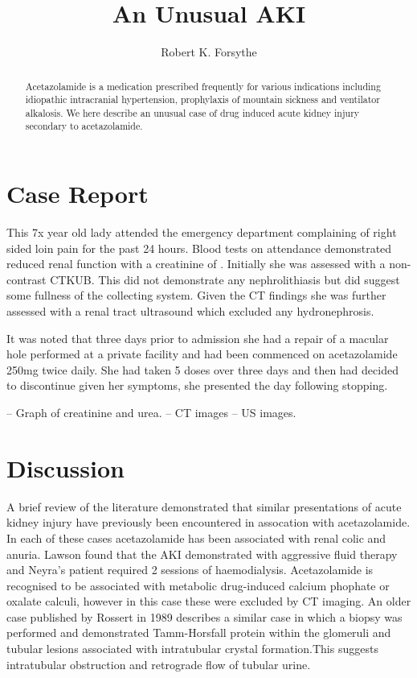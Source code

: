 \documentclass[11pt]{article}
\title{An Unusual AKI}
\author{Robert K. Forsythe}
\begin{document}
\maketitle
\begin{abstract}
	Acetazolamide is a medication prescribed frequently for various indications including idiopathic intracranial hypertension, prophylaxis of mountain sickness and ventilator alkalosis. We here describe an unusual case of drug induced acute kidney injury secondary to acetazolamide. 
\end{abstract}
		
\section*{Case Report}

This 7x year old lady attended the emergency department complaining of right sided loin pain for the past 24 hours. Blood tests on attendance demonstrated reduced renal function with a creatinine of \todo. Initially she was assessed with a non-contrast CTKUB. This did not demonstrate any nephrolithiasis but did suggest some fullness of the collecting system. Given the CT findings she was further assessed with a renal tract ultrasound which excluded any hydronephrosis. 

It was noted that three days prior to admission she had a repair of a macular hole performed at a private facility and had been commenced on acetazolamide 250mg twice daily. She had taken 5 doses over three days and then had decided to discontinue given her symptoms, she presented the day following stopping. 


-- Graph of creatinine and urea.
-- CT images
-- US images. 


\section*{Discussion}
A brief review of the literature demonstrated that similar presentations of acute kidney injury have previously been encountered in assocation with acetazolamide\cite{Neyra2014, Rossert1984, Lawson2020}. In each of these cases acetazolamide has been associated with renal colic and anuria. Lawson found that the AKI demonstrated with aggressive fluid therapy and Neyra's patient required 2 sessions of haemodialysis. Acetazolamide is recognised to be associated with metabolic drug-induced calcium phophate or oxalate calculi, however in this case these were excluded by CT imaging. An older case published by Rossert in 1989 describes a similar case in which a biopsy was performed and demonstrated Tamm-Horsfall protein within the glomeruli and tubular lesions associated with intratubular crystal formation.This suggests intratubular obstruction and retrograde flow of tubular urine\cite{Rossert1984}.  

\printbibliography
\end{document}
